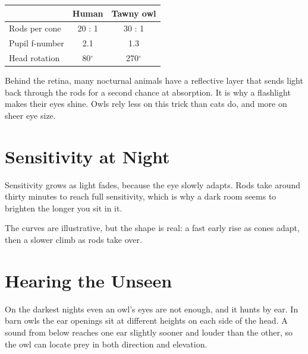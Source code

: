 \documentclass[11pt]{article}
\begin{document}
\begin{center}
\small
\begin{tabular}{@{}lcc@{}}
\toprule
 & Human & Tawny owl \\
\midrule
Rods per cone       & 20 : 1   & 30 : 1 \\
Pupil f-number      & 2.1      & 1.3 \\
Head rotation       & 80$^\circ$ & 270$^\circ$ \\
\bottomrule
\end{tabular}
\end{center}

Behind the retina, many nocturnal animals have a reflective layer that sends
light back through the rods for a second chance at absorption. It is why a
flashlight makes their eyes shine. Owls rely less on this trick than cats do,
and more on sheer eye size.

\section{Sensitivity at Night}
Sensitivity grows as light fades, because the eye slowly adapts. Rods take
around thirty minutes to reach full sensitivity, which is why a dark room seems
to brighten the longer you sit in it.

\begin{center}
\end{center}

The curves are illustrative, but the shape is real: a fast early rise as cones
adapt, then a slower climb as rods take over.

\section{Hearing the Unseen}
On the darkest nights even an owl's eyes are not enough, and it hunts by ear.
In barn owls the ear openings sit at different heights on each side of the
head. A sound from below reaches one ear slightly sooner and louder than the
other, so the owl can locate prey in both direction and elevation.
\end{document}
